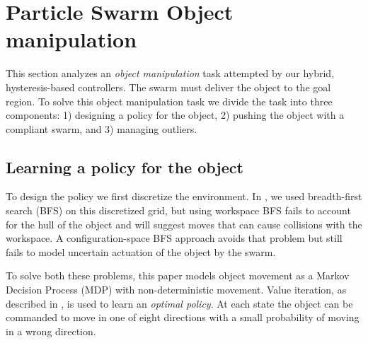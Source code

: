 
\section{Particle Swarm Object manipulation}\label{sec:exp}

This section analyzes an \emph{object manipulation} task attempted by our hybrid, hysteresis-based controllers. The swarm must deliver the object to the goal region.  To solve this object manipulation task we divide the task into three components: 1) designing a policy for the object, 2) pushing the object with a compliant swarm, and 3) managing outliers.
\subsection{Learning a policy for the object}\label{subsec:objectpolicy}

To design the policy we first discretize the environment. 
In \cite{ShahrokhiIROS2015}, we used breadth-first search (BFS) on this discretized grid, but using workspace BFS fails to account for the hull of the object and will suggest moves that can cause collisions with the workspace. A configuration-space BFS approach avoids that problem but still fails to model uncertain actuation of the object by the swarm.

To solve both these problems, this paper models object movement as a Markov Decision Process (MDP) with non-deterministic movement.  
  Value iteration,  as described in \cite{Thrun2005}, is used to learn an \emph{optimal policy}.
   At each state the object can be commanded to move in one of eight directions with a small probability of moving in a wrong direction. 
 
